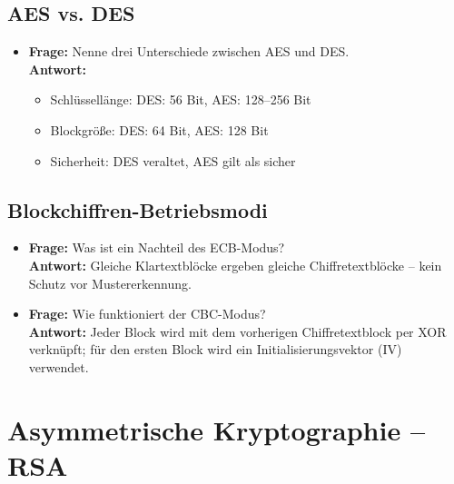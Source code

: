 \documentclass[a4paper,12pt]{article}
\begin{document}
\subsection*{AES vs. DES}
\begin{itemize}[leftmargin=*]
  \item \textbf{Frage:} Nenne drei Unterschiede zwischen AES und DES.\\
  \textbf{Antwort:}
  \begin{itemize}
    \item Schlüssellänge: DES: 56 Bit, AES: 128–256 Bit
    \item Blockgröße: DES: 64 Bit, AES: 128 Bit
    \item Sicherheit: DES veraltet, AES gilt als sicher
  \end{itemize}
\end{itemize}

\subsection*{Blockchiffren-Betriebsmodi}
\begin{itemize}[leftmargin=*]
  \item \textbf{Frage:} Was ist ein Nachteil des ECB-Modus?\\
  \textbf{Antwort:} Gleiche Klartextblöcke ergeben gleiche Chiffretextblöcke – kein Schutz vor Mustererkennung.

  \item \textbf{Frage:} Wie funktioniert der CBC-Modus?\\
  \textbf{Antwort:} Jeder Block wird mit dem vorherigen Chiffretextblock per XOR verknüpft; für den ersten Block wird ein Initialisierungsvektor (IV) verwendet.
\end{itemize}

\section*{Asymmetrische Kryptographie – RSA}
\end{document}
